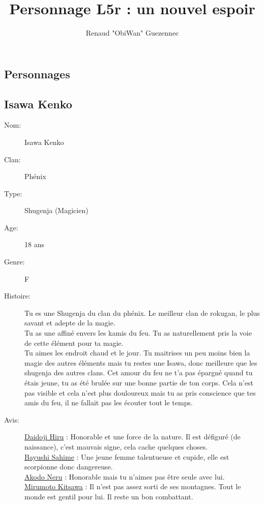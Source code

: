 \documentclass[oneside,12pt]{book}
\title{Personnage L5r : un nouvel espoir}
\author{Renaud "ObiWan" Guezennec}
\date{}
\begin{document}
\maketitle \clearpage
\tableofcontents \clearpage

\begin{flushleft}

\chapter{Personnages}
\clearpage
\section{Isawa Kenko}
\begin{description}
\item[Nom:]{Isawa Kenko}
\item[Clan:]{Phénix}
\item[Type:]{Shugenja (Magicien)}
\item[Age:]{18 ans}
\item[Genre:]{F}
\item[Histoire:]{
Tu es une Shugenja du clan du phénix. Le meilleur clan de rokugan, le plus savant et adepte de la magie.\\
Tu as une affiné envers les kamis du feu. Tu as naturellement pris la voie de cette élément pour ta magie.\\
Tu aimes les endroit chaud et le jour. Tu maitrises un peu moins bien la magie des autres éléments mais tu restes une Isawa, donc meilleure que les shugenja des autres clans.
Cet amour du feu ne t'a pas épargné quand tu étais jeune, tu as été brulée sur une bonne partie de ton corps. Cela n'est pas visible et cela n'est plus douloureux mais tu as pris conscience que tes amis du feu, il ne fallait pas les écouter tout le temps.\\
\vspace{0.2cm}
}
\item[Avis:]{
\underline{Daidoji Hiru} : Honorable et une force de la nature. Il est défiguré (de naissance), c'est mauvais signe, cela cache quelques choses.\\
\underline{Bayushi Sahime} : Une jeune femme talentueuse et cupide, elle est scorpionne donc dangereuse.\\
\underline{Akodo Neru} : Honorable mais tu n'aimes pas être seule avec lui. \\
\underline{Mirumoto Kitsawa} : Il n'est pas assez sorti de ses montagnes. Tout le monde est gentil pour lui. Il reste un bon combattant. \\
}
\end{description}
\end{flushleft}
\end{document}

